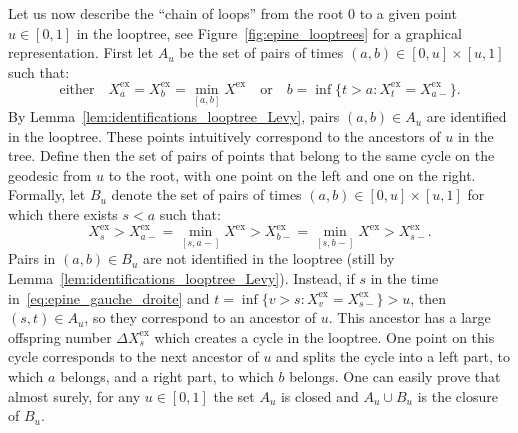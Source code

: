 \documentclass[british, a4paper,11pt]{article}
\numberwithin{equation}{section}
\theoremstyle{definition}
\newcommand{\exc}{\mathrm{ex}}
\begin{document}
Let us now describe the ``chain of loops'' from the root $0$ to a given point $u \in [0,1]$ in the looptree, see Figure~\ref{fig:epine_looptrees} for a graphical representation. 
First let $A_u$ be the set of pairs of times $(a,b) \in [0,u] \times [u,1]$ such that:
\begin{equation}\label{eq:def_ancetres}
\text{either}\quad 
X^{\exc}_a = X^{\exc}_b = \min_{[a,b]} X^{\exc}
\quad\text{or}\quad 
b = \inf\{t > a \colon X^{\exc}_t = X^{\exc}_{a-}\}.
\end{equation}
By Lemma~\ref{lem:identifications_looptree_Levy}, pairs $(a,b) \in A_u$ are identified in the looptree. These points intuitively correspond to the ancestors of $u$ in the tree. Define then the set of pairs of points that belong to the same cycle on the geodesic from $u$ to the root, with one point on the left and one on the right. 
Formally, let $B_u$ denote the set of pairs of times $(a,b) \in [0,u] \times [u,1]$ for which there exists $s<a$ such that:
\begin{equation}\label{eq:epine_gauche_droite}
X^{\exc}_{s} > X^{\exc}_{a-} = \min_{[s,a-]} X^{\exc} > X^{\exc}_{b-} = \min_{[s,b-]} X^{\exc} > X^{\exc}_{s-}
.\end{equation}
Pairs in $(a,b) \in B_u$ are not identified in the looptree (still by Lemma~\ref{lem:identifications_looptree_Levy}). 
Instead, if $s$ in the time in~\eqref{eq:epine_gauche_droite} and $t = \inf\{v > s \colon X^{\exc}_v = X^{\exc}_{s-}\} > u$, then $(s,t) \in A_u$, so they correspond to an ancestor of $u$.
This ancestor has a large offspring number $\Delta X^{\exc}_s$ which creates a cycle in the looptree. One point on this cycle corresponds to the next ancestor of $u$ and splits the cycle into a left part, to which $a$ belongs, and a right part, to which $b$ belongs.
One can easily prove that almost surely, for any $u \in [0,1]$ the set $A_u$ is closed and $A_u \cup B_u$ is the closure of $B_u$.
\end{document}
